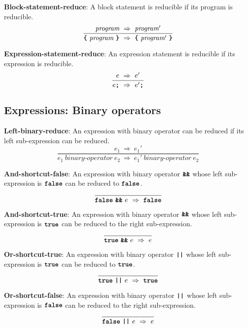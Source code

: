 \textbf{Block-statement-reduce}: A block statement is
reducible if its program is reducible.
\[
\frac{
  \textit{program} 
\ \Rightarrow \ 
  \textit{program}'
}{  
  \textbf{\texttt{\{}} \
  \textit{program} \ 
  \textbf{\texttt{\}}}
\  \Rightarrow \ 
  \textbf{\texttt{\{}} \
  \textit{program}' \ 
  \textbf{\texttt{\}}}
}
\]

\textbf{Expression-statement-reduce}: An expression statement
is reducible if its expression is reducible.
\[
\frac{
  e\ \Rightarrow\ e'
}{  
  e \textbf{\texttt{;}}
  \ \Rightarrow \ 
  e' \textbf{\texttt{;}}
}
\]


\subsection*{Expressions: Binary operators}

\textbf{Left-binary-reduce}: An expression with binary operator
can be reduced if its left sub-expression can be reduced.
\[
\frac{
  e_1 \ \Rightarrow \ e_1'
}{
  e_1\  \textit{binary-operator} \ e_2
  \ \Rightarrow \ 
  e_1'\  \textit{binary-operator} \ e_2
}
\]


\vspace{10mm}
\textbf{And-shortcut-false}: An expression with binary operator
$\textbf{\texttt{\&\&}}$ whose left sub-expression is
$\textbf{\texttt{false}}$ can be reduced to
$\textbf{\texttt{false}}$.
\[
\frac{
}{
  \textbf{\texttt{false}}\  \textbf{\texttt{\&\&}}\ e
  \ \Rightarrow \ 
  \textbf{\texttt{false}}
}
\]

\vspace{10mm}
\textbf{And-shortcut-true}: An expression with binary operator
$\textbf{\texttt{\&\&}}$ whose left sub-expression is
$\textbf{\texttt{true}}$ can be reduced to
the right sub-expression.
\[
\frac{
}{
  \textbf{\texttt{true}}\  \textbf{\texttt{\&\&}}\ e
  \ \Rightarrow \ 
  e
}
\]

\vspace{10mm}
\textbf{Or-shortcut-true}: An expression with binary operator
$\textbf{\texttt{||}}$ whose left sub-expression is
$\textbf{\texttt{true}}$ can be reduced to
$\textbf{\texttt{true}}$.
\[
\frac{
}{
  \textbf{\texttt{true}}\  \textbf{\texttt{||}}\ e
  \ \Rightarrow \ 
  \textbf{\texttt{true}}
}
\]

\vspace{10mm}
\textbf{Or-shortcut-false}: An expression with binary operator
$\textbf{\texttt{||}}$ whose left sub-expression is
$\textbf{\texttt{false}}$ can be reduced to
the right sub-expression.
\[
\frac{
}{
  \textbf{\texttt{false}}\  \textbf{\texttt{||}}\ e
  \ \Rightarrow \ 
  e
}
\]

